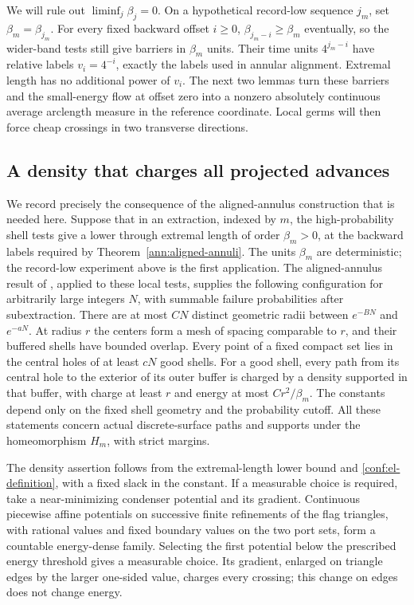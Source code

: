 We will rule out \(\liminf_j\beta_j=0\).  On a hypothetical
record-low sequence \(j_m\), set \(\beta_m=\beta_{j_m}\).
For every fixed backward offset \(i\ge0\),
\(\beta_{j_m-i}\ge\beta_m\) eventually, so the wider-band tests
still give barriers in \(\beta_m\) units.  Their time units
\(4^{j_m-i}\) have relative labels \(v_i=4^{-i}\), exactly the
labels used in annular alignment.  Extremal length has no additional
power of \(v_i\).  The next two lemmas turn these barriers and the
small-energy flow at offset zero into a nonzero absolutely continuous
average arclength measure in the reference coordinate.  Local germs
will then force cheap crossings in two transverse directions.

\subsection{A density that charges all projected advances}
\label{conf:density-subsection}

We record precisely the consequence of the aligned-annulus construction
that is needed here.  Suppose that in an extraction, indexed by \(m\),
the high-probability shell tests give a lower through extremal length
of order \(\beta_m>0\), at the backward labels required by
Theorem~\ref{ann:aligned-annuli}.  The units \(\beta_m\) are
deterministic; the record-low experiment above is the first application.
The aligned-annulus result of , applied to
these local tests, supplies the following configuration for arbitrarily
large integers \(N\), with summable failure probabilities after
subextraction.  There are at most \(C N\) distinct geometric radii
between \(e^{-BN}\) and \(e^{-aN}\).  At radius \(r\) the centers
form a mesh of spacing comparable to \(r\), and their buffered shells
have bounded overlap.  Every point of a fixed compact set lies in the
central holes of at least \(cN\) good shells.  For a good shell, every
path from its central hole to the exterior of its outer buffer is
charged by a density supported in that buffer, with charge at least
\(r\) and energy at most \(Cr^2/\beta_m\).  The constants depend
only on the fixed shell geometry and the probability cutoff.  All these
statements concern actual discrete-surface paths and supports under
the homeomorphism \(H_m\), with strict margins.

The density assertion follows from the extremal-length lower bound and
\eqref{conf:el-definition}, with a fixed slack in the constant.  If a
measurable choice is required, take a near-minimizing condenser
potential and its gradient.  Continuous piecewise affine potentials
on successive finite refinements of the flag triangles, with rational
values and fixed boundary values on the two port sets, form a
countable energy-dense family.  Selecting the first potential below
the prescribed energy threshold gives a measurable choice.  Its
gradient, enlarged on triangle edges by the larger one-sided value,
charges every crossing; this change on edges does not change energy.

